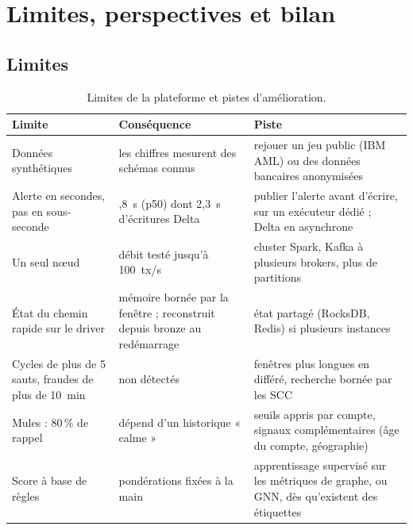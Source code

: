 \chapter{Limites, perspectives et bilan}
\label{ch:bilan}

\section{Limites}
\begin{table}[htp]
\centering\small
\begin{tabular}{@{}>{\raggedright\arraybackslash}p{4.4cm}>{\raggedright\arraybackslash}p{5.0cm}>{\raggedright\arraybackslash}p{4.8cm}@{}}
\toprule
\sffamily\bfseries Limite & \sffamily\bfseries Conséquence & \sffamily\bfseries Piste\\
\midrule
Données synthétiques & les chiffres mesurent des schémas connus & rejouer un jeu public (IBM AML) ou des données bancaires anonymisées\\
Alerte en secondes, pas en sous-seconde & 3,8~s (p50) dont 2,3~s d'écritures Delta & publier l'alerte avant d'écrire, sur un exécuteur dédié ; Delta en asynchrone\\
Un seul nœud & débit testé jusqu'à 100~tx/s & cluster Spark, Kafka à plusieurs brokers, plus de partitions\\
État du chemin rapide sur le driver & mémoire bornée par la fenêtre ; reconstruit depuis bronze au redémarrage & état partagé (RocksDB, Redis) si plusieurs instances\\
Cycles de plus de 5 sauts, fraudes de plus de 10~min & non détectés & fenêtres plus longues en différé, recherche bornée par les SCC\\
Mules : 80\,\% de rappel & dépend d'un historique « calme » & seuils appris par compte, signaux complémentaires (âge du compte, géographie)\\
Score à base de règles & pondérations fixées à la main & apprentissage supervisé sur les métriques de graphe, ou GNN, dès qu'existent des étiquettes\\
\bottomrule
\end{tabular}
\caption{Limites de la plateforme et pistes d'amélioration.}
\label{tab:limites}
\end{table}

